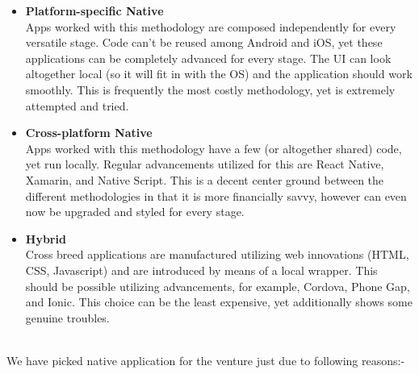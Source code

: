 \begin{itemize}
  \item \textbf{Platform-specific Native} \\
  Apps worked with this methodology are composed independently for every versatile stage. Code can't be reused among Android and iOS, yet these applications can be completely advanced for every stage. The UI can look altogether local (so it will fit in with the OS) and the application should work smoothly. This is frequently the most costly methodology, yet is extremely attempted and tried.
  
  \item \textbf{Cross-platform Native} \\ 
  Apps worked with this methodology have a few (or altogether shared) code, yet run locally. Regular advancements utilized for this are React Native, Xamarin, and Native Script. This is a decent center ground between the different methodologies in that it is more financially savvy, however can even now be upgraded and styled for every stage.
  
  \item \textbf{Hybrid} \\
 Cross breed applications are manufactured utilizing web innovations (HTML, CSS, Javascript) and are introduced by means of a local wrapper. This should be possible utilizing advancements, for example, Cordova, Phone Gap, and Ionic. This choice can be the least expensive, yet additionally shows some genuine troubles.
\end{itemize}

\\We have picked native application for the venture just due to following reasons:-

